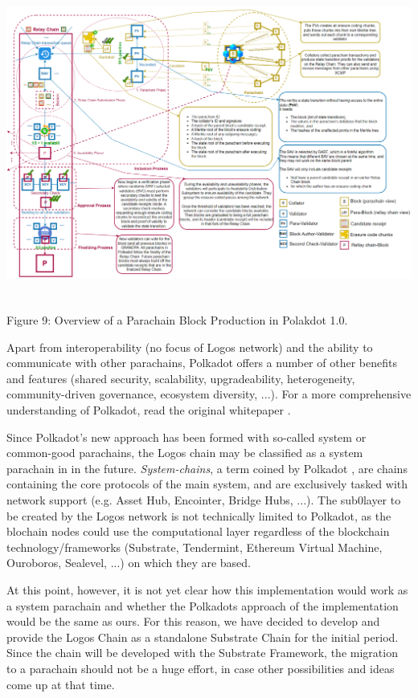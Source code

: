 \documentclass[]{article}
\begin{document}
\begin{center}
	\includegraphics[height=10.2cm]{polkadot-tech-overview}
\end{center}
\begin{center}
	Figure 9: Overview of a Parachain Block Production in Polakdot 1.0. \cite{Parity-book-parachain}
\end{center}

Apart from interoperability (no focus of Logos network) and the ability to communicate with other parachains, Polkadot offers a number of other benefits and features (shared security, scalability, upgradeability, heterogeneity, community-driven governance, ecosystem diversity, ...).
For a more comprehensive understanding of Polkadot, read the original whitepaper \cite{Polkadot-whitepaper}.

Since Polkadot's new approach has been formed with so-called system or common-good parachains, the Logos chain may be classified as a system parachain in in the future. 
\textit{System-chains}, a term coined by Polkadot \cite{PolkadotDoc-sys-parachain}, are chains containing the core protocols of the main system, and are exclusively tasked with network support (e.g. Asset Hub, Encointer, Bridge Hubs, ...).
The sub0layer to be created by the Logos network is not technically limited to Polkadot, as the blochain nodes could use the computational layer regardless of the blockchain technology/frameworks (Substrate, Tendermint, Ethereum Virtual Machine, Ouroboros, Sealevel, ...) on which they are based.

At this point, however, it is not yet clear how this implementation would work as a system parachain and whether the Polkadots approach of the implementation would be the same as ours.
For this reason, we have decided to develop and provide the Logos Chain as a standalone Substrate Chain for the initial period.
Since the chain will be developed with the Substrate Framework, the migration to a parachain should not be a huge effort, in case other possibilities and ideas come up at that time.
\end{document}
